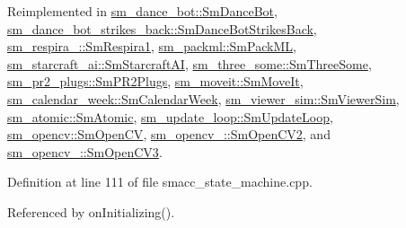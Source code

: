 Reimplemented in \hyperlink{structsm__dance__bot_1_1SmDanceBot_a1baf6710e3e4755483e1e8441bb0f910}{sm\+\_\+dance\+\_\+bot\+::\+Sm\+Dance\+Bot}, \hyperlink{structsm__dance__bot__strikes__back_1_1SmDanceBotStrikesBack_ad6a9ef45cc05cb6fed4550f2f04d4a3e}{sm\+\_\+dance\+\_\+bot\+\_\+strikes\+\_\+back\+::\+Sm\+Dance\+Bot\+Strikes\+Back}, \hyperlink{structsm__respira__1_1_1SmRespira1_a6be26eb018ef73a2e39772fe4a03e551}{sm\+\_\+respira\+\_\+::\+Sm\+Respira1}, \hyperlink{structsm__packml_1_1SmPackML_a977b226f0602ce502cd3678f9066a450}{sm\+\_\+packml\+::\+Sm\+Pack\+ML}, \hyperlink{structsm__starcraft__ai_1_1SmStarcraftAI_a16d8896df860ce9098a7eb7ccce90a4c}{sm\+\_\+starcraft\+\_\+ai\+::\+Sm\+Starcraft\+AI}, \hyperlink{structsm__three__some_1_1SmThreeSome_ac811ac731023ccbab1db358d0efa1c0e}{sm\+\_\+three\+\_\+some\+::\+Sm\+Three\+Some}, \hyperlink{structsm__pr2__plugs_1_1SmPR2Plugs_acfafd0eeb3863f00a79704f656d4f4c6}{sm\+\_\+pr2\+\_\+plugs\+::\+Sm\+P\+R2\+Plugs}, \hyperlink{structsm__moveit_1_1SmMoveIt_af2af89c1cb101214c2925b0818d74be5}{sm\+\_\+moveit\+::\+Sm\+Move\+It}, \hyperlink{structsm__calendar__week_1_1SmCalendarWeek_a4c01af9a3190d10d3794e82bd087e121}{sm\+\_\+calendar\+\_\+week\+::\+Sm\+Calendar\+Week}, \hyperlink{structsm__viewer__sim_1_1SmViewerSim_a1ad4e963a078af53a55097c6eb78cae0}{sm\+\_\+viewer\+\_\+sim\+::\+Sm\+Viewer\+Sim}, \hyperlink{structsm__atomic_1_1SmAtomic_ac87a3d5a78eb48b949b3948f9ce28d24}{sm\+\_\+atomic\+::\+Sm\+Atomic}, \hyperlink{structsm__update__loop_1_1SmUpdateLoop_a7434ac83f9a7a1732b5814cb307522a6}{sm\+\_\+update\+\_\+loop\+::\+Sm\+Update\+Loop}, \hyperlink{structsm__opencv_1_1SmOpenCV_ae32fcae433bed3e834b5860bb0046eb4}{sm\+\_\+opencv\+::\+Sm\+Open\+CV}, \hyperlink{structsm__opencv__2_1_1SmOpenCV2_a3fa2a5e2bd0ea90ec283068d817783c0}{sm\+\_\+opencv\+\_\+::\+Sm\+Open\+C\+V2}, and \hyperlink{structsm__opencv__3_1_1SmOpenCV3_a596d368fb62df454ce0ec9d7f90604f5}{sm\+\_\+opencv\+\_\+::\+Sm\+Open\+C\+V3}.



Definition at line 111 of file smacc\+\_\+state\+\_\+machine.\+cpp.



Referenced by on\+Initializing().


